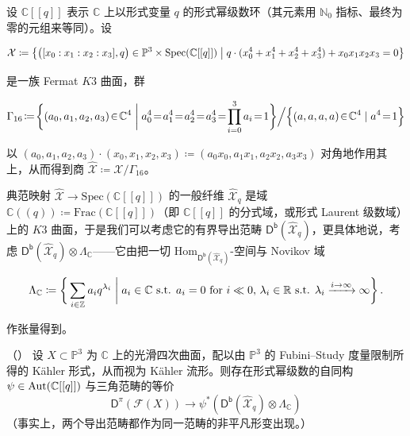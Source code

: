 \begin{Def}\label{Seidelstuff}
设 $\mathbb{C}[[q]]$ 表示 $\mathbb{C}$ 上以形式变量 $q$ 的形式幂级数环（其元素用 $\mathbb{N}_0$ 指标、最终为零的元组来等同）。设
\begin{small}\[
	\mathcal{X}\coloneqq\big\{\big([x_0:x_1:x_2:x_3],q\big)\in\mathbb{P}^3\times\text{Spec}(\mathbb{C}[[q]])\bigm| q\cdot(x_0^4+x_1^4+x_2^4+x_3^4)+x_0x_1x_2x_3=0\big\}
	\]\end{small}
\!\!是一族 Fermat $K3$ 曲面，群
\begin{small}\[
	\Gamma_{16}\!\coloneqq\!\bigg\{(a_0,a_1,a_2,a_3)\!\in\!\mathbb{C}^4\biggm| a_0^4\!=\!a_1^4\!=\!a_2^4\!=\!a_3^4\!=\!\prod_{i=0}^3a_i\!=\!1\bigg\}\Big/\Big\{(a,a,a,a)\!\in\!\mathbb{C}^4\mid a^4\!=\!1\Big\}
	\]\end{small}
\!\!以 $(a_0,a_1,a_2,a_3)\cdot(x_0,x_1,x_2,x_3)\coloneqq(a_0x_0,a_1x_1,a_2x_2,a_3x_3)$ 对角地作用其上，从而得到商 $\widehat{\mathcal{X}}\coloneqq\mathcal{X}/\Gamma_{16}$。

典范映射 $\widehat{\mathcal{X}}\rightarrow\text{Spec}(\mathbb{C}[[q]])$ 的一般纤维 $\widehat{\mathcal{X}}_q$ 是域 $\mathbb{C}((q))\coloneqq\text{Frac}(\mathbb{C}[[q]])$（即 $\mathbb{C}[[q]]$ 的分式域，或形式 Laurent 级数域）上的 $K3$ 曲面，于是我们可以考虑它的有界导出范畴 $\mathsf{D^b}(\widehat{\mathcal{X}}_q)$，更具体地说，考虑 $\mathsf{D^b}(\widehat{\mathcal{X}}_q)\otimes\Lambda_\mathbb{C}$——它由把一切 $\text{Hom}_{\mathsf{D^b}(\widehat{\mathcal{X}}_q)}$-空间与 Novikov 域
\begin{small}\[
	\Lambda_\mathbb{C}\coloneqq\bigg\{\sum_{i\in\mathbb{Z}}a_iq^{\lambda_i}\biggm| a_i\in\mathbb{C}\text{ s.t. }a_i=0\text{ for }i\ll 0,\,\lambda_i\in\mathbb{R} \text{ s.t. }\lambda_i\xrightarrow{i\to\infty}\infty \bigg\}\,.
	\]\end{small}
作张量得到。
\end{Def}


\begin{Thm}\textup{（\cite[定理 1.3]{[Sei13]}）}\label{HMSforK3conj}
设 $X\subset\mathbb{P}^3$ 为 $\mathbb{C}$ 上的光滑四次曲面，配以由 $\mathbb{P}^3$ 的 Fubini--Study 度量限制所得的 Kähler 形式，从而视为 Kähler 流形。则存在形式幂级数的自同构 $\psi\in\textup{Aut}(\mathbb{C}[[q]])$ 与三角范畴的等价
\begin{equation}\label{HMSforK3}
	\mathsf{D^\pi}(\mathscr{F}(X))\rightarrow\psi^*(\mathsf{D^b}(\widehat{\mathcal{X}}_q)\otimes\Lambda_\mathbb{C})
\end{equation}
\textup（事实上，两个导出范畴都作为同一范畴的非平凡形变出现。\textup）
\end{Thm}

